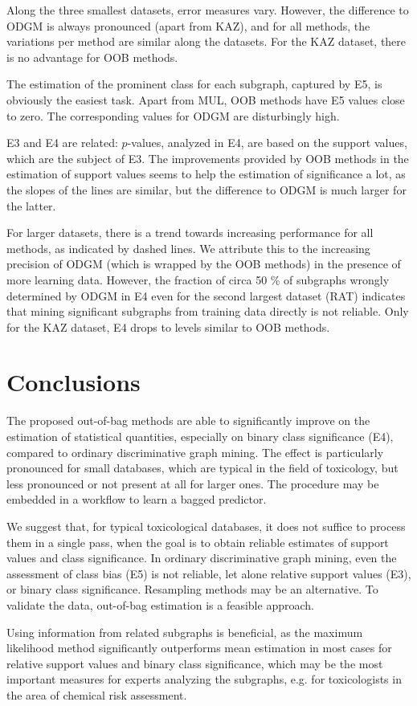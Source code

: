 \documentclass{sig-alternate}
\begin{document}
Along the three smallest datasets, error measures vary.  However, the difference
to ODGM is always pronounced (apart from KAZ), and for all methods, the variations per method
are similar along the datasets. For the KAZ dataset, there is no advantage for OOB methods.

The estimation of the prominent class for each subgraph, captured by E5, is
obviously the easiest task. Apart from MUL, OOB methods have E5 values close to
zero. The corresponding values for ODGM are disturbingly high.

E3 and E4 are related: $p$-values, analyzed in E4, are based on the support
values, which are the subject of E3.  The improvements provided by OOB methods
in the estimation of support values seems to help the estimation of
significance a lot, as the slopes of the lines are similar, but the difference
to ODGM is much larger for the latter.

For larger datasets, there is a trend towards increasing performance for all
methods, as indicated by dashed lines.
We attribute this to the increasing precision of ODGM (which is wrapped by the
OOB methods) in the presence of more learning data. However, the fraction of
circa 50 \% of subgraphs wrongly determined by ODGM in E4 even for the second
largest dataset (RAT) indicates that mining significant subgraphs from training
data directly is not reliable. Only for the KAZ dataset, E4 drops to levels
similar to OOB methods.

\section{Conclusions}
\label{s:Conclusion}
The proposed out-of-bag methods are able to significantly improve on the estimation of
statistical quantities, especially on binary class significance (E4), compared to ordinary
discriminative graph mining.  The effect is particularly pronounced for small
databases, which are typical in the field of toxicology, but less pronounced or not present at all for larger ones. The
procedure may be embedded in a workflow to learn a bagged predictor.

We suggest that, for typical toxicological
databases, it does not suffice to process them in a single pass, when the goal
is to obtain reliable estimates of support values and class significance.  In
ordinary discriminative graph mining, even the assessment of class bias (E5) is
not reliable, let alone relative support values (E3), or binary class significance.
Resampling methods may be an alternative. To validate
the data, out-of-bag estimation is a feasible approach.

Using information from related subgraphs is beneficial, as the maximum
likelihood method significantly outperforms mean estimation in most cases
for relative support values and binary class significance, which may be the
most important measures for experts analyzing the subgraphs, e.g. for toxicologists 
in the area of chemical risk assessment.




\end{document}
